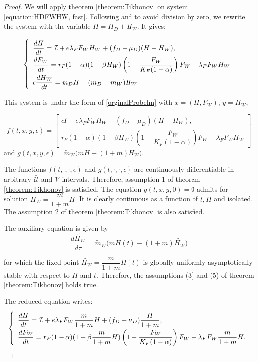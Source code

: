 \documentclass{article}
\newcommand{\lfw}{\lambda_{F}}
\newcommand{\lfw}{\lambda_{F}}
\newcommand{\cI}{\mathcal{I}}
\newcommand{\mW}{\tilde{m}_W}
\begin{document}
\begin{proof}
We will apply theorem \ref{theorem:Tikhonov} on system \eqref{equation:HDFWHW, fast}. Following \cite{banasiak_methods_2014} and to avoid division by zero, we rewrite the system with the variable $H = H_D + H_W$. It gives:

\begin{equation*} 
\def\arraystretch{2}
\left\{ 
\begin{array}{l}
\dfrac{dH}{dt}= \cI + e\lfw F_WH_W + (f_D - \mu_D)(H - H_W), \\
\dfrac{dF_W}{dt} = r_F(1- \alpha) (1+ \beta H_W) \left(1 - \dfrac{F_W}{K_F(1-\alpha)} \right) F_W - \lfw F_W H_W \\
\epsilon \dfrac{dH_W}{dt}= m_D H - (m_D + m_W) H_W
\end{array} \right.
\label{equation:HFWHW} 
\end{equation*}

This system 
is under the form of \eqref{orginalProbelm} with $x = (H, F_W)$, $y = H_W$,  

$$f(t,x,y,\epsilon) = \begin{bmatrix}
cI + e\lfw F_W H_W + (f_D - \mu_D) (H - H_W), \\
r_F(1- \alpha) (1+ \beta H_W) \left(1 - \dfrac{F_W}{K_F(1-\alpha)} \right) F_W - \lfw F_W H_W
\end{bmatrix}  $$
and $g(t,x,y,\epsilon) = \mW \Big(m H - (1 + m)H_W \Big) $.

The functions $f(t, \cdot, \cdot, \epsilon)$ and $g(t, \cdot, \cdot, \epsilon)$ are continuously differentiable in arbitrary $\mathcal{\bar{U}}$ and $\mathcal{V}$ intervals. Therefore, assumption 1 of theorem \ref{theorem:Tikhonov} is satisfied. The equation $ g(t,x,y,0) =  0$ admits for solution $H_W = \dfrac{m}{1+m}H$. It is clearly continuous as a function of $t, H$ and isolated. The assumption 2 of theorem \ref{theorem:Tikhonov} is also satisfied.

The auxiliary equation is given by
\begin{equation*}
\dfrac{d \tilde{H_W}}{d \tau} = \mW \Big(m H(t) - (1 + m)\tilde{H_W} \Big)
\end{equation*}

for which the fixed point $\tilde{H_W} = \dfrac{m}{1+m}H(t)$ is globally uniformly asymptotically stable with respect to $H$ and $t$. Therefore, the assumptions (3) and (5) of theorem \ref{theorem:Tikhonov} holds true.

The reduced equation writes:
\begin{equation} \label{equationHFW}
\def\arraystretch{2}
\left\lbrace \begin{array}{l}
\dfrac{dH}{dt}= \cI + e\lfw F_W\dfrac{m}{1+m}H + (f_D - \mu_D)\dfrac{H}{1+m}, \\
\dfrac{dF_W}{dt} = r_F(1- \alpha) (1+ \beta \dfrac{m}{1+m}H ) \left(1 - \dfrac{F_W}{K_F(1-\alpha)} \right) F_W - \lfw F_W \dfrac{m}{1+m}H.  \\
\end{array} \right.
\end{equation}


\end{proof}
\end{document}

